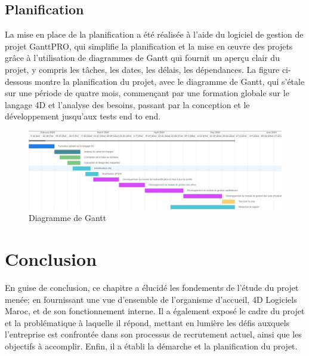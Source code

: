 \subsection{Planification}
La mise en place de la planification a été réalisée à l’aide du logiciel de gestion de
projet GanttPRO, qui simplifie la planification et la mise en œuvre des projets grâce à
l’utilisation de diagrammes de Gantt qui fournit un aperçu clair du projet, y compris les
tâches, les dates, les délais, les dépendances.
La figure ci-dessous montre la planification du projet, avec le diagramme de Gantt,
qui s’étale sur une période de quatre mois, commençant par une formation globale sur
le langage 4D et l’analyse des besoins, passant par la conception et le développement
jusqu’aux tests end to end.

\begin{figure}[h]
    \centering
    \includegraphics[scale=0.6]{Images/gantt.jpg} %
    \caption{Diagramme de Gantt}
    \label{fig:gantt}
\end{figure}


\section{Conclusion}
En guise de conclusion, ce chapitre a élucidé les fondements de l’étude du projet
menée; en fournissant une vue d’ensemble de l’organisme d’accueil, 4D Logiciels Maroc,
et de son fonctionnement interne. Il a également exposé le cadre du projet et la problématique à laquelle
il répond, mettant en lumière les défis auxquels l’entreprise est confrontée dans son
processus de recrutement actuel, ainsi que les objectifs à accomplir. Enfin, il a établi la
démarche et la planification du projet.


